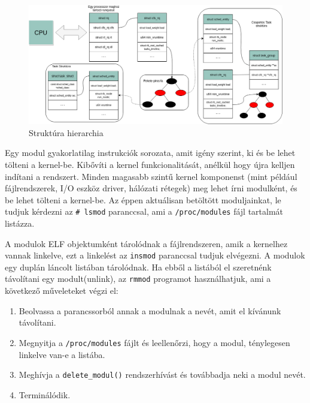 \begin{figure}[h!]
\centering
\includegraphics[width=\textwidth]{images/structureHierarchy.png}
\caption{Struktúra hierarchia}
\label{fig:structurehierarchi}
\end{figure}



Egy modul gyakorlatilag instrukciók sorozata, amit igény szerint, ki és be lehet tölteni a kernel-be. Kibővíti a kernel funkcionalitását, anélkül hogy újra kelljen indítani a rendszert. Minden magasabb szintű kernel komponenst (mint például fájlrendszerek, I/O eszköz driver, hálózati rétegek) meg lehet írni modulként, és be lehet tölteni a kernel-be.
Az éppen aktuálisan betöltött moduljainkat, le tudjuk kérdezni az \texttt{\# lsmod} paranccsal, ami a \texttt{/proc/modules} fájl tartalmát listázza.

A modulok ELF objektumként tárolódnak a fájlrendszeren, amik a kernelhez vannak linkelve, ezt a linkelést az \texttt{insmod} paranccsal tudjuk elvégezni.
A modulok egy duplán láncolt listában tárolódnak.
Ha ebből a listából el szeretnénk távolítani egy modult(unlink), az \texttt{rmmod} programot használhatjuk, ami a következő műveleteket végzi el:
\begin{enumerate}
	\item Beolvassa a parancssorból annak a modulnak a nevét, amit el kívánunk távolítani.
	\item Megnyitja a \texttt{/proc/modules} fájlt és leellenőrzi, hogy a modul, ténylegesen linkelve van-e a listába.
	\item Meghívja a \texttt{delete\_modul()} rendszerhívást és továbbadja neki a modul nevét.
	\item Terminálódik.
\end{enumerate} 

